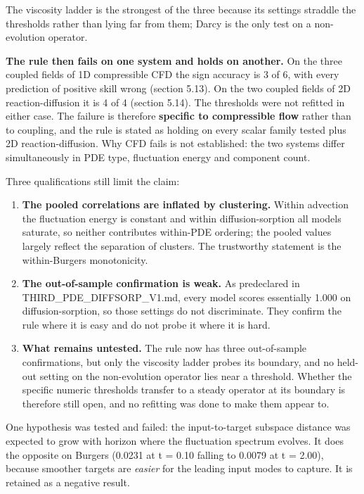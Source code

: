 \documentclass[preprint,12pt]{elsarticle}
\begin{document}
The viscosity ladder is the strongest of the three because its settings straddle the thresholds rather than lying far from them; Darcy is the only test on a non-evolution operator.

\textbf{The rule then fails on one system and holds on another.} On the three coupled fields of 1D compressible CFD the sign accuracy is 3 of 6, with every prediction of positive skill wrong (section 5.13). On the two coupled fields of 2D reaction-diffusion it is 4 of 4 (section 5.14). The thresholds were not refitted in either case. The failure is therefore \textbf{specific to compressible flow} rather than to coupling, and the rule is stated as holding on every scalar family tested plus 2D reaction-diffusion. Why CFD fails is not established: the two systems differ simultaneously in PDE type, fluctuation energy and component count.

Three qualifications still limit the claim:

\begin{enumerate}
\item \textbf{The pooled correlations are inflated by clustering.} Within advection the fluctuation energy is constant and within diffusion-sorption all models saturate, so neither contributes within-PDE ordering; the pooled values largely reflect the separation of clusters. The trustworthy statement is the within-Burgers monotonicity.
\item \textbf{The out-of-sample confirmation is weak.} As predeclared in THIRD\_PDE\_DIFFSORP\_V1.md, every model scores essentially 1.000 on diffusion-sorption, so those settings do not discriminate. They confirm the rule where it is easy and do not probe it where it is hard.
\item \textbf{What remains untested.} The rule now has three out-of-sample confirmations, but only the viscosity ladder probes its boundary, and no held-out setting on the non-evolution operator lies near a threshold. Whether the specific numeric thresholds transfer to a steady operator at its boundary is therefore still open, and no refitting was done to make them appear to.
\end{enumerate}


One hypothesis was tested and failed: the input-to-target subspace distance was expected to grow with horizon where the fluctuation spectrum evolves. It does the opposite on Burgers (0.0231 at t = 0.10 falling to 0.0079 at t = 2.00), because smoother targets are \emph{easier} for the leading input modes to capture. It is retained as a negative result.
\end{document}
